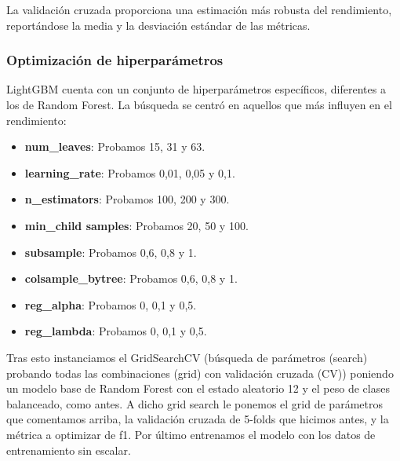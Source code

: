 La validación cruzada proporciona una estimación más robusta del rendimiento, reportándose la media y la desviación estándar de las métricas.

\subsubsection*{Optimización de hiperparámetros}

LightGBM cuenta con un conjunto de hiperparámetros específicos, diferentes a los de Random Forest. La búsqueda se centró en aquellos que más influyen en el rendimiento:

\begin{itemize}
	\item \textbf{num\_leaves}: Probamos 15, 31 y 63.
	\item \textbf{learning\_rate}: Probamos 0,01, 0,05 y 0,1.
	\item \textbf{n\_estimators}: Probamos 100, 200 y 300.
	\item \textbf{min\_child samples}: Probamos 20, 50 y 100.
	\item \textbf{subsample}: Probamos 0,6, 0,8 y 1.
	\item \textbf{colsample\_bytree}: Probamos 0,6, 0,8 y 1.
	\item \textbf{reg\_alpha}: Probamos 0, 0,1 y 0,5.
	\item \textbf{reg\_lambda}: Probamos 0, 0,1 y 0,5.
\end{itemize}

Tras esto instanciamos el GridSearchCV (búsqueda de parámetros (search) probando todas las combinaciones (grid) con validación cruzada (CV)) poniendo un modelo base de Random Forest con el estado aleatorio 12 y el peso de clases balanceado, como antes. A dicho grid search le ponemos el grid de parámetros que comentamos arriba, la validación cruzada de 5-folds que hicimos antes, y la métrica a optimizar de f1. Por último entrenamos el modelo con los datos de entrenamiento sin escalar.